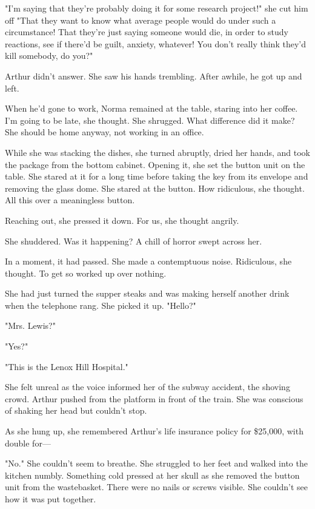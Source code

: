 \documentclass[10pt,a4paper]{book}
\newcommand{\glos}[3]{\dotuline{#1}\marginpar{\scriptsize\textit{#3} #2}}
\begin{document}
"I'm saying that they're probably doing it for some research project!" she cut him off "That they want to know what average people would do under such a circumstance! That they're just saying someone would die, in order to study reactions, see if there'd be guilt, anxiety, whatever! You don't really think they'd kill somebody, do you?"

Arthur didn't answer. She saw his hands trembling. After awhile, he got up and left.



When he'd gone to work, Norma remained at the table, staring into her coffee. I'm going to be late, she thought. She shrugged. What difference did it make? She should be home anyway, not working in an office.

While she was stacking the dishes, she turned abruptly, dried her hands, and took the package from the bottom cabinet. Opening it, she set the button unit on the table. She stared at it for a long time before taking the key from its envelope and removing the glass dome. She stared at the button. How ridiculous, she thought. All this over a meaningless button.

Reaching out, she pressed it down. For us, she thought angrily.

She shuddered. Was it happening? A chill of horror swept across her.

In a moment, it had passed. She made a contemptuous noise. Ridiculous, she thought. To get so worked up over nothing.

She had just turned the supper steaks and was making herself another drink when the telephone rang. She picked it up. "Hello?"

"Mrs. Lewis?"

"Yes?"

"This is the Lenox Hill Hospital."

She felt unreal as the voice informed her of the subway accident, the shoving crowd. Arthur pushed from the platform in front of the train. She was conscious of shaking her head but couldn't stop.

As she hung up, she remembered Arthur's life insurance policy for \$25,000, with double \glos{indemnity}{erstatning}{sb.} for---

"No." She couldn't seem to breathe. She struggled to her feet and walked into the kitchen numbly. Something cold pressed at her skull as she removed the button unit from the wastebasket. There were no nails or screws visible. She couldn't see how it was put together.
\end{document}
